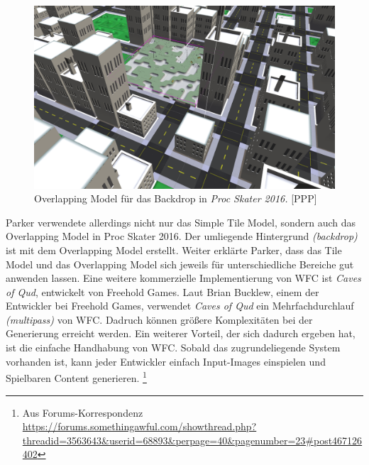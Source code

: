 \documentclass[12pt, a4paper,twoside,openright]{report}
\begin{document}
\begin{figure}
    \includegraphics[width=1\linewidth]{images/proc-skate-backdrop.png}%
    \caption{Overlapping Model für das Backdrop in \textit{Proc Skater 2016.} {[PPP]}}%
\end{figure}

Parker verwendete allerdings nicht nur das Simple Tile Model, sondern auch das Overlapping Model in Proc Skater 2016.
Der umliegende Hintergrund \textit{(backdrop)} ist mit dem Overlapping Model erstellt.
Weiter erklärte Parker, dass das Tile Model und das Overlapping Model sich jeweils für unterschiedliche Bereiche gut anwenden lassen.
\newline
Eine weitere kommerzielle Implementierung von WFC ist \textit{Caves of Qud}, entwickelt von Freehold Games.
Laut Brian Bucklew, einem der Entwickler bei Freehold Games, verwendet \textit{Caves of Qud} ein Mehrfachdurchlauf \textit{(multipass)} von WFC.
Dadruch können größere Komplexitäten bei der Generierung erreicht werden.
Ein weiterer Vorteil, der sich dadurch ergeben hat, ist die einfache Handhabung von WFC.
Sobald das zugrundeliegende System vorhanden ist, kann jeder Entwickler einfach Input-Images einspielen und Spielbaren Content generieren.
\footnote[6]{Aus Forums-Korrespondenz \url{https://forums.somethingawful.com/showthread.php?threadid=3563643&userid=68893&perpage=40&pagenumber=23\#post467126402}} \cite{Karth2017WaveFunctionCollapseIC}
\end{document}
